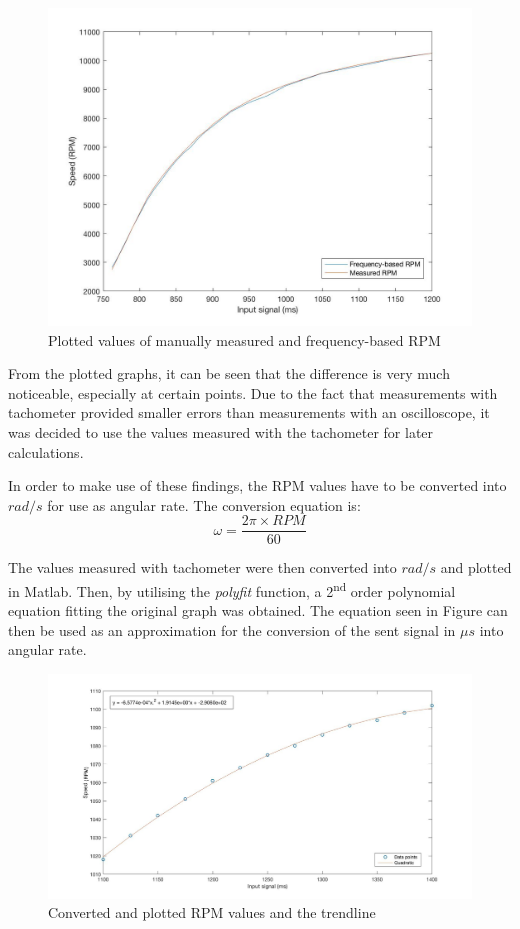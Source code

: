 \begin{figure}[H]
  \centering
    \includegraphics[width=1\textwidth]{images/rpm66.jpg}
	\caption{Plotted values of manually measured and frequency-based RPM}
	\label{RPMvsFreq}
\end{figure}

From the plotted graphs, it can be seen that the difference is very much noticeable, especially at certain points. Due to the fact that measurements with tachometer provided smaller errors than measurements with an oscilloscope, it was decided to use the values measured with the tachometer for later calculations.

In order to make use of these findings, the RPM values have to be converted into $rad/s$ for use as angular rate. The conversion equation is:
\begin{equation}
\label{RPMConvert}
	\omega = \frac{2\pi \times RPM}{60}
\end{equation}

The values measured with tachometer were then converted into $rad/s$ and plotted in Matlab. Then, by utilising the \textit{polyfit} function, a 2\textsuperscript{nd} order polynomial equation fitting the original graph was obtained. The equation seen in Figure \label{RadsTrendline} can then be used as an approximation for the conversion of the sent signal in $\mu s$ into angular rate.

\begin{figure}[H]
  \centering
    \includegraphics[width=1\textwidth]{images/mstorpm.jpg}
	\caption{Converted and plotted RPM values and the trendline}
	\label{RadsTrendline}
\end{figure}

